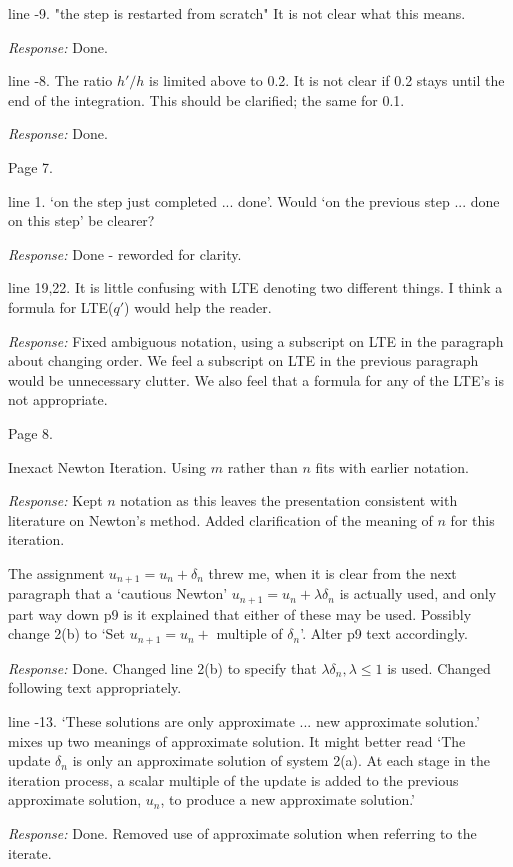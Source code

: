 \documentclass[12pt]{letter}
\begin{document}
line -9. "the step is restarted from scratch" It is not clear what this means.

{\em Response:} Done.

line -8. The ratio $h'/h$ is limited above to 0.2. It is not clear if
0.2 stays until the end of the integration. This should be clarified;
the same for 0.1.

{\em Response:} Done.

Page 7.

line 1. `on the step just completed ... done'. Would `on the previous step ...
done on this step' be clearer?

{\em Response:} Done - reworded for clarity.

line 19,22. It is little confusing with LTE denoting two different things.
I think a formula for LTE($q'$) would help the reader.

{\em Response:} Fixed ambiguous notation, using a subscript on LTE in the
paragraph about changing order.  We feel a subscript on LTE in the previous
paragraph would be unnecessary clutter.  We also feel that a formula for
any of the LTE's is not appropriate.

Page 8.

Inexact Newton Iteration. Using $m$ rather than $n$ fits with earlier
notation.

{\em Response:} Kept $n$ notation as this leaves the presentation
consistent with literature on Newton's method.  Added
clarification of the meaning of $n$ for this iteration.

The assignment $u_{n+1} = u_n + \delta_n$ threw me, when it is clear
from the next paragraph that a `cautious Newton' $u_{n+1} = u_n +
\lambda\delta_n$ is actually used, and only part way down p9 is it
explained that either of these may be used. Possibly change 2(b) to
`Set $u_{n+1} = u_n + $ multiple of $\delta_n$'. Alter p9 text accordingly.

{\em Response: } Done. Changed line 2(b) to specify that $\lambda
\delta_n, \lambda \leq 1$ is used.  Changed following text
appropriately.

line -13. `These solutions are only approximate ... new approximate
solution.'  mixes up two meanings of approximate solution. It might
better read `The update $\delta_n$ is only an approximate solution of
system 2(a). At each stage in the iteration process, a scalar multiple
of the update is added to the previous approximate solution, $u_n$, to
produce a new approximate solution.'

{\em Response: } Done. Removed use of approximate solution when
referring to the iterate.
\end{document}
